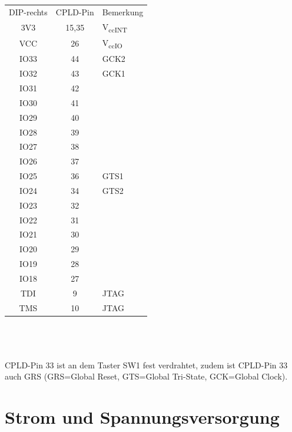 \documentclass{article}
\begin{document}
\begin{minipage}{0.2\textwidth}
	\begin{tabular}{||c|c|l}
		DIP-rechts	& CPLD-Pin & Bemerkung\\
		\rowcolor[gray]{.8}	3V3		& 15,35 &	V\textsubscript{ccINT} \\
		VCC		& 26 & 		V\textsubscript{ccIO}\\
		\rowcolor[gray]{.8}	IO33	& 44 &		GCK2\\
		IO32	& 43 &		GCK1\\
		\rowcolor[gray]{.8}	IO31	& 42 &\\
		IO30	& 41 &\\
		\rowcolor[gray]{.8}	IO29	& 40 &\\
		IO28	& 39 &\\
		\rowcolor[gray]{.8}	IO27	& 38 &\\
		IO26	& 37 &\\
		\rowcolor[gray]{.8}	IO25	& 36 &		GTS1\\
		IO24	& 34 &							GTS2\\
		\rowcolor[gray]{.8}	IO23	& 32 &\\
		IO22	& 31 &\\
		\rowcolor[gray]{.8}	IO21	& 30 &\\
		IO20	& 29 &\\
		\rowcolor[gray]{.8}	IO19	& 28 &\\
		IO18	& 27 &\\
		\rowcolor[gray]{.8}	TDI		& 9 &		JTAG\\	
		TMS		& 10 & 		JTAG 
	\end{tabular}
\end{minipage}
\\\\\\
CPLD-Pin 33 ist an dem Taster SW1 fest verdrahtet, zudem ist CPLD-Pin 33 auch GRS
(GRS=Global Reset, GTS=Global Tri-State, GCK=Global Clock).
\newpage




\section{Strom und Spannungsversorgung}
\end{document}
